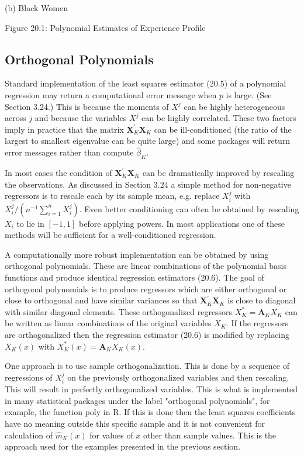 \documentclass[10pt]{article}
\begin{document}
(b) Black Women

Figure 20.1: Polynomial Estimates of Experience Profile

\subsection{Orthogonal Polynomials}
Standard implementation of the least squares estimator (20.5) of a polynomial regression may return a computational error message when $p$ is large. (See Section 3.24.) This is because the moments of $X^{j}$ can be highly heterogeneous across $j$ and because the variables $X^{j}$ can be highly correlated. These two factors imply in practice that the matrix $\boldsymbol{X}_{K}^{\prime} \boldsymbol{X}_{K}$ can be ill-conditioned (the ratio of the largest to smallest eigenvalue can be quite large) and some packages will return error messages rather than compute $\widehat{\beta}_{K}$.

In most cases the condition of $\boldsymbol{X}_{K}^{\prime} \boldsymbol{X}_{K}$ can be dramatically improved by rescaling the observations. As discussed in Section $3.24$ a simple method for non-negative regressors is to rescale each by its sample mean, e.g. replace $X_{i}^{j}$ with $X_{i}^{j} /\left(n^{-1} \sum_{i=1}^{n} X_{i}^{j}\right)$. Even better conditioning can often be obtained by rescaling $X_{i}$ to lie in $[-1,1]$ before applying powers. In most applications one of these methods will be sufficient for a well-conditioned regression.

A computationally more robust implementation can be obtained by using orthogonal polynomials. These are linear combinations of the polynomial basis functions and produce identical regression estimators (20.6). The goal of orthogonal polynomials is to produce regressors which are either orthogonal or close to orthogonal and have similar variances so that $\boldsymbol{X}_{K}^{\prime} \boldsymbol{X}_{K}$ is close to diagonal with similar diagonal elements. These orthogonalized regressors $X_{K}^{*}=\boldsymbol{A}_{K} X_{K}$ can be written as linear combinations of the original variables $X_{K}$. If the regressors are orthogonalized then the regression estimator (20.6) is modified by replacing $X_{K}(x)$ with $X_{K}^{*}(x)=\boldsymbol{A}_{K} X_{K}(x)$.

One approach is to use sample orthogonalization. This is done by a sequence of regressions of $X_{i}^{j}$ on the previously orthogonalized variables and then rescaling. This will result in perfectly orthogonalized variables. This is what is implemented in many statistical packages under the label "orthogonal polynomials", for example, the function poly in R. If this is done then the least squares coefficients have no meaning outside this specific sample and it is not convenient for calculation of $\widehat{m}_{K}(x)$ for values of $x$ other than sample values. This is the approach used for the examples presented in the previous section.
\end{document}
